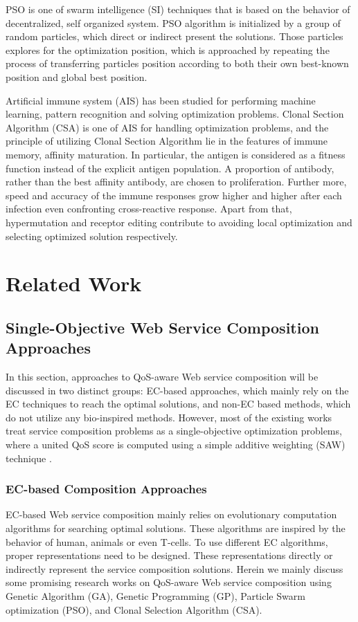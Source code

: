 PSO is one of swarm intelligence (SI) techniques that is based on the behavior of decentralized, self organized system. PSO algorithm is initialized by a group of random particles, which direct or indirect present the solutions. Those particles explores for the optimization position, which is approached by repeating the process of transferring particles position according to both their own best-known position and global best position.

Artificial immune system (AIS) has been studied for performing machine learning, pattern recognition and solving optimization problems.  Clonal Section Algorithm (CSA) is one of AIS for handling optimization problems, and the principle of utilizing Clonal Section Algorithm lie in the features of immune memory, affinity maturation. In particular, the antigen is considered as a fitness function instead of the explicit antigen population. A proportion of antibody, rather than the best affinity antibody, are chosen to proliferation. Further more, speed and accuracy of the immune responses grow higher and higher after each infection even confronting cross-reactive response. Apart from that, hypermutation and receptor editing contribute to avoiding local optimization and selecting optimized solution respectively. 


\section{Related Work}\label{related}

\subsection{Single-Objective Web Service Composition Approaches}\label{singleobjective}

In this section, approaches to QoS-aware Web service composition will be discussed in two distinct groups: EC-based approaches, which mainly rely on the EC techniques to reach the optimal solutions, and non-EC based methods, which do not utilize any bio-inspired methods. However, most of the existing works treat service composition problems as a single-objective optimization problems, where a united QoS score is computed using a simple additive weighting (SAW) technique \cite{hwang1981lecture}.
\subsubsection{EC-based Composition Approaches}
EC-based Web service composition mainly relies on evolutionary computation algorithms for searching optimal solutions. These algorithms are inspired by the behavior of human, animals or even T-cells. To use different EC algorithms, proper representations need to be designed. These representations directly or indirectly represent the service composition solutions. Herein we mainly discuss some promising research works on QoS-aware Web service composition using  Genetic Algorithm (GA), Genetic Programming (GP), Particle Swarm optimization (PSO), and Clonal Selection Algorithm (CSA).

